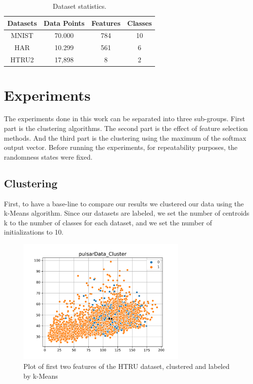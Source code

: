\documentclass[journal]{IEEEtran}
\begin{document}
  \begin{table}[!ht]
  \renewcommand{\arraystretch}{1.3}
  \caption{Dataset statistics.}
  \label{tab_datasets}
  \centering
  \begin{tabular}{|c||c|c|c|}
  \hline
  Datasets &    Data Points &  Features &  Classes \\
  \hline
  \hline
  MNIST &    70.000 &   784 &                 10 \\
  \hline
  HAR &       10.299 &   561 &                 6 \\
  \hline
  HTRU2 &    17,898 &   8 &                  2 \\
  \hline
  \end{tabular}
  \end{table}
\section{Experiments}
The experiments done in this work can be separated into three sub-groups. First part is the clustering algorithms. The second part is the effect of feature selection methods. And the third part is the clustering using the maximum of the softmax output vector. Before running the experiments, for repeatability purposes, the randomness states were fixed.  

\subsection{Clustering }

First, to have a base-line to compare our results we clustered our data using the k-Means algorithm. Since our datasets are labeled, we set the number of centroids k to the number of classes for each dataset, and we set the number of initializations to 10.

\begin{figure}[!ht]
  \centering
  \includegraphics[width=3.3in]{images/pulsarData_Cluster.png}
  \caption{Plot of first two features of the HTRU dataset, clustered and labeled by k-Means}
  \label{fig_pulsarData_Cluster}
\end{figure}
\par
\end{document}
